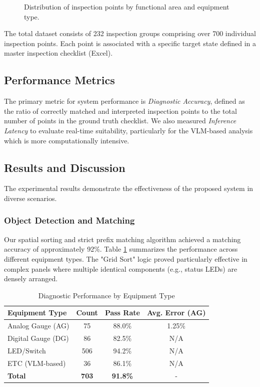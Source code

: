\begin{figure}[h]
\centering
\fbox{\rule{0pt}{1.5in} \rule{0.8\linewidth}{0pt}} %
\caption{Distribution of inspection points by functional area and equipment type.}
\label{fig:dataset_dist}
\end{figure}

The total dataset consists of 232 inspection groups comprising over 700 individual inspection points.
 Each point is associated with a specific target state defined in a master inspection checklist (Excel).

\subsection{Performance Metrics}
The primary metric for system performance is \textit{Diagnostic Accuracy}, defined as the ratio of correctly matched and interpreted inspection points to the total number of points in the ground truth checklist. We also measured \textit{Inference Latency} to evaluate real-time suitability, particularly for the VLM-based analysis which is more computationally intensive.

\subsection{Results and Discussion}
The experimental results demonstrate the effectiveness of the proposed system in diverse scenarios.

\subsubsection{Object Detection and Matching}
Our spatial sorting and strict prefix matching algorithm achieved a matching accuracy of approximately 92\%. Table \ref{tab:matching_results} summarizes the performance across different equipment types. The "Grid Sort" logic proved particularly effective in complex panels where multiple identical components (e.g., status LEDs) are densely arranged.

\begin{table}[h]
\caption{Diagnostic Performance by Equipment Type}
\label{tab:matching_results}
\centering
\begin{tabular}{|l|c|c|c|}
\hline
\textbf{Equipment Type} & \textbf{Count} & \textbf{Pass Rate} & \textbf{Avg. Error (AG)} \\
\hline
Analog Gauge (AG) & 75 & 88.0\% & 1.25\% \\
Digital Gauge (DG) & 86 & 82.5\% & N/A \\
LED/Switch & 506 & 94.2\% & N/A \\
ETC (VLM-based) & 36 & 86.1\% & N/A \\
\hline
\textbf{Total} & \textbf{703} & \textbf{91.8\%} & - \\
\hline
\end{tabular}
\end{table}


